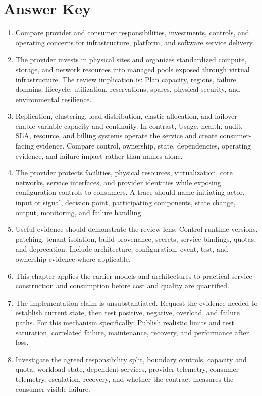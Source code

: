 \documentclass[11pt]{article}
\begin{document}
\section{Answer Key}
\begin{enumerate}
\item Compare provider and consumer responsibilities, investments, controls, and operating concerns for infrastructure, platform, and software service delivery.
\item The provider invests in physical sites and organizes standardized compute, storage, and network resources into managed pools exposed through virtual infrastructure. The review implication is: Plan capacity, regions, failure domains, lifecycle, utilization, reservations, spares, physical security, and environmental resilience.
\item Replication, clustering, load distribution, elastic allocation, and failover enable variable capacity and continuity. In contrast, Usage, health, audit, SLA, resource, and billing systems operate the service and create consumer-facing evidence. Compare control, ownership, state, dependencies, operating evidence, and failure impact rather than names alone.
\item The provider protects facilities, physical resources, virtualization, core networks, service interfaces, and provider identities while exposing configuration controls to consumers. A trace should name initiating actor, input or signal, decision point, participating components, state change, output, monitoring, and failure handling.
\item Useful evidence should demonstrate the review lens: Control runtime versions, patching, tenant isolation, build provenance, secrets, service bindings, quotas, and deprecation. Include architecture, configuration, event, test, and ownership evidence where applicable.
\item This chapter applies the earlier models and architectures to practical service construction and consumption before cost and quality are quantified.
\item The implementation claim is unsubstantiated. Request the evidence needed to establish current state, then test positive, negative, overload, and failure paths. For this mechanism specifically: Publish realistic limits and test saturation, correlated failure, maintenance, recovery, and performance after loss.
\item Investigate the agreed responsibility split, boundary controls, capacity and quota, workload state, dependent services, provider telemetry, consumer telemetry, escalation, recovery, and whether the contract measures the consumer-visible failure.

\end{enumerate}
\end{document}
